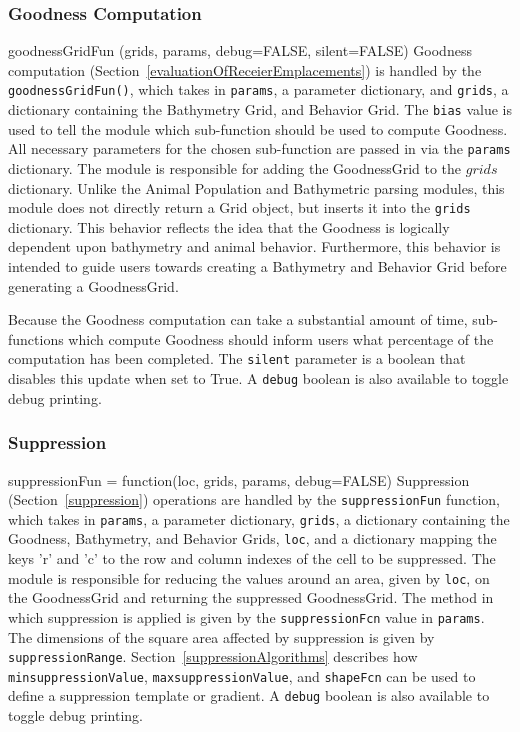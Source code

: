 \subsubsection{Goodness Computation}
goodnessGridFun (grids, params, debug=FALSE, silent=FALSE) 
Goodness computation (Section~\ref{evaluationOfReceierEmplacements}) is handled by the \texttt{goodnessGridFun()}, which takes in \texttt{params}, a parameter dictionary, and \texttt{grids}, a dictionary containing the Bathymetry Grid, and Behavior Grid.  The \texttt{bias} value is used to tell the module which sub-function should be used to compute Goodness.  All necessary parameters for the chosen sub-function are passed in via the \texttt{params} dictionary.  The module is responsible for adding the GoodnessGrid to the $grids$ dictionary.  Unlike the Animal Population and Bathymetric parsing modules, this module does not directly return a Grid object, but inserts it into the \texttt{grids} dictionary.  This behavior reflects the idea that the Goodness is logically dependent upon bathymetry and animal behavior.  Furthermore, this behavior is intended to guide users towards creating a Bathymetry and Behavior Grid before generating a GoodnessGrid.

Because the Goodness computation can take a substantial amount of time, sub-functions which compute Goodness should inform users what percentage of the computation has been completed.  The \texttt{silent} parameter is a boolean that disables this update when set to True.  A \texttt{debug} boolean is also available to toggle debug printing.

\subsubsection{Suppression}
suppressionFun = function(loc, grids, params, debug=FALSE)
Suppression (Section~\ref{suppression}) operations are handled by the \texttt{suppressionFun} function, which takes in \texttt{params}, a parameter dictionary, \texttt{grids}, a dictionary containing the Goodness, Bathymetry, and Behavior Grids, \texttt{loc}, and a dictionary mapping the keys 'r' and 'c' to the row and column indexes of the cell to be suppressed.  The module is responsible for reducing the values around an area, given by \texttt{loc}, on the GoodnessGrid and returning the suppressed GoodnessGrid.  The method in which suppression is applied is given by the \texttt{suppressionFcn} value in \texttt{params}.  The dimensions of the square area affected by suppression is given by \texttt{suppressionRange}.  Section~\ref{suppressionAlgorithms} describes how \texttt{minsuppressionValue}, \texttt{maxsuppressionValue}, and \texttt{shapeFcn} can be used to define a suppression template or gradient.  A \texttt{debug} boolean is also available to toggle debug printing.

